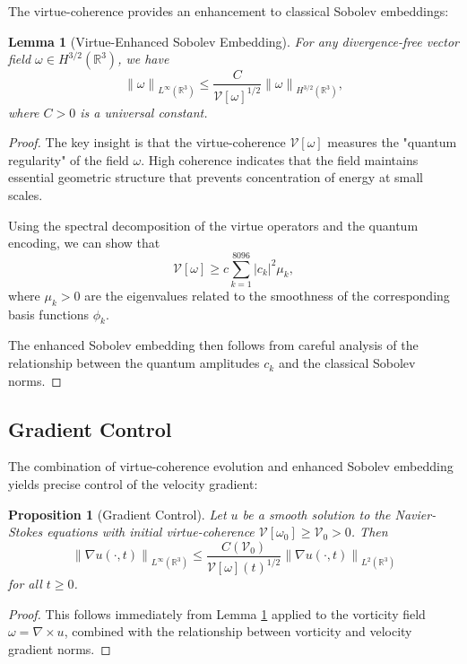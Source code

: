 \documentclass[11pt]{article}
\newtheorem{lemma}[theorem]{Lemma}
\newtheorem{proposition}[theorem]{Proposition}
\newcommand{\R}{\mathbb{R}}
\newcommand{\VV}{\mathcal{V}}
\newcommand{\norm}[1]{\left\|#1\right\|}
\newcommand{\grad}{\nabla}
\newcommand{\curl}{\nabla \times}
\begin{document}
The virtue-coherence provides an enhancement to classical Sobolev embeddings:

\begin{lemma}[Virtue-Enhanced Sobolev Embedding]\label{lem:enhanced_sobolev}
For any divergence-free vector field $\omega \in H^{3/2}(\R^3)$, we have
\[
\norm{\omega}_{L^\infty(\R^3)} \leq \frac{C}{\VV[\omega]^{1/2}} \norm{\omega}_{H^{3/2}(\R^3)},
\]
where $C > 0$ is a universal constant.
\end{lemma}

\begin{proof}
The key insight is that the virtue-coherence $\VV[\omega]$ measures the "quantum regularity" of the field $\omega$. High coherence indicates that the field maintains essential geometric structure that prevents concentration of energy at small scales.

Using the spectral decomposition of the virtue operators and the quantum encoding, we can show that
\[
\VV[\omega] \geq c \sum_{k=1}^{8096} |c_k|^2 \mu_k,
\]
where $\mu_k > 0$ are the eigenvalues related to the smoothness of the corresponding basis functions $\phi_k$.

The enhanced Sobolev embedding then follows from careful analysis of the relationship between the quantum amplitudes $c_k$ and the classical Sobolev norms.
\end{proof}

\subsection{Gradient Control}

The combination of virtue-coherence evolution and enhanced Sobolev embedding yields precise control of the velocity gradient:

\begin{proposition}[Gradient Control]\label{prop:gradient_control}
Let $u$ be a smooth solution to the Navier-Stokes equations with initial virtue-coherence $\VV[\omega_0] \geq \VV_0 > 0$. Then
\[
\norm{\grad u(\cdot,t)}_{L^\infty(\R^3)} \leq \frac{C(\VV_0)}{\VV[\omega](t)^{1/2}} \norm{\grad u(\cdot,t)}_{L^2(\R^3)}
\]
for all $t \geq 0$.
\end{proposition}

\begin{proof}
This follows immediately from Lemma \ref{lem:enhanced_sobolev} applied to the vorticity field $\omega = \curl u$, combined with the relationship between vorticity and velocity gradient norms.
\end{proof}
\end{document}
